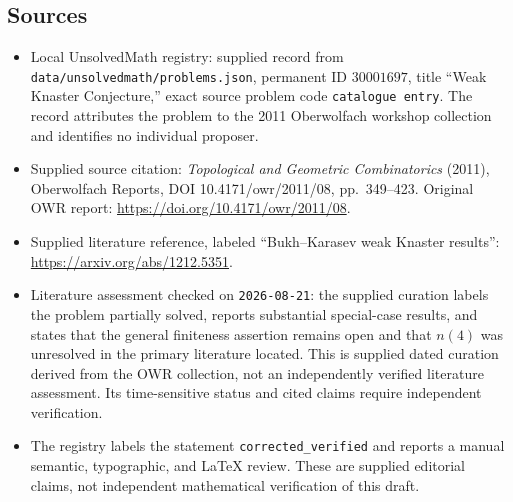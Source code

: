 \documentclass[11pt]{article}
\begin{document}
\subsection{Sources}
\begin{itemize}
\item Local UnsolvedMath registry: supplied record from \texttt{data/unsolvedmath/problems.json}, permanent ID \(30001697\), title ``Weak Knaster Conjecture,'' exact source problem code \texttt{catalogue entry}. The record attributes the problem to the 2011 Oberwolfach workshop collection and identifies no individual proposer.
\item Supplied source citation: \emph{Topological and Geometric Combinatorics} (2011), Oberwolfach Reports, DOI 10.4171/owr/2011/08, pp.~349--423. Original OWR report: \url{https://doi.org/10.4171/owr/2011/08}.
\item Supplied literature reference, labeled ``Bukh--Karasev weak Knaster results'': \url{https://arxiv.org/abs/1212.5351}.
\item Literature assessment checked on \texttt{2026-08-21}: the supplied curation labels the problem partially solved, reports substantial special-case results, and states that the general finiteness assertion remains open and that \(n(4)\) was unresolved in the primary literature located. This is supplied dated curation derived from the OWR collection, not an independently verified literature assessment. Its time-sensitive status and cited claims require independent verification.
\item The registry labels the statement \texttt{corrected\_verified} and reports a manual semantic, typographic, and LaTeX review. These are supplied editorial claims, not independent mathematical verification of this draft.
\end{itemize}
\end{document}
